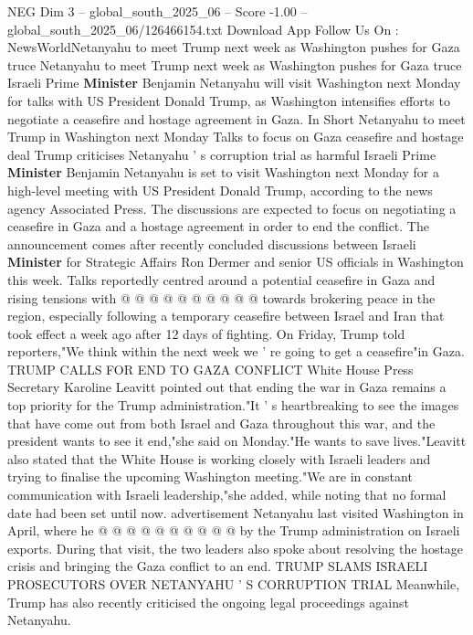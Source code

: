 \begin{textsample}{NEG Dim 3 – global\_south\_2025\_06 – Score -1.00 – global\_south\_2025\_06/126466154.txt}  \label{ex:f3_neg_266}
Download App Follow Us On : NewsWorldNetanyahu to meet Trump next week as Washington pushes for Gaza truce Netanyahu to meet Trump next week as Washington pushes for Gaza truce Israeli Prime \textbf{Minister} Benjamin Netanyahu will visit Washington next Monday for talks with US President Donald Trump, as Washington intensifies efforts to negotiate a ceasefire and hostage agreement in Gaza.
In Short Netanyahu to meet Trump in Washington next Monday Talks to focus on Gaza ceasefire and hostage deal Trump criticises Netanyahu ' s corruption trial as harmful Israeli Prime \textbf{Minister} Benjamin Netanyahu is set to visit Washington next Monday for a high-level meeting with US President Donald Trump, according to the news agency Associated Press.
The discussions are expected to focus on negotiating a ceasefire in Gaza and a hostage agreement in order to end the conflict.
The announcement comes after recently concluded discussions between Israeli \textbf{Minister} for Strategic Affairs Ron Dermer and senior US officials in Washington this week.
Talks reportedly centred around a potential ceasefire in Gaza and rising tensions with @ @ @ @ @ @ @ @ @ @ towards brokering peace in the region, especially following a temporary ceasefire between Israel and Iran that took effect a week ago after 12 days of fighting.
On Friday, Trump told reporters,"We think within the next week we ' re going to get a ceasefire"in Gaza.
TRUMP CALLS FOR END TO GAZA CONFLICT White House Press Secretary Karoline Leavitt pointed out that ending the war in Gaza remains a top priority for the Trump administration."It ' s heartbreaking to see the images that have come out from both Israel and Gaza throughout this war, and the president wants to see it end,"she said on Monday."He wants to save lives."Leavitt also stated that the White House is working closely with Israeli leaders and trying to finalise the upcoming Washington meeting."We are in constant communication with Israeli leadership,"she added, while noting that no formal date had been set until now. advertisement Netanyahu last visited Washington in April, where he @ @ @ @ @ @ @ @ @ @ by the Trump administration on Israeli exports.
During that visit, the two leaders also spoke about resolving the hostage crisis and bringing the Gaza conflict to an end.
TRUMP SLAMS ISRAELI PROSECUTORS OVER NETANYAHU ' S CORRUPTION TRIAL Meanwhile, Trump has also recently criticised the ongoing legal proceedings against Netanyahu.

\end{textsample}
